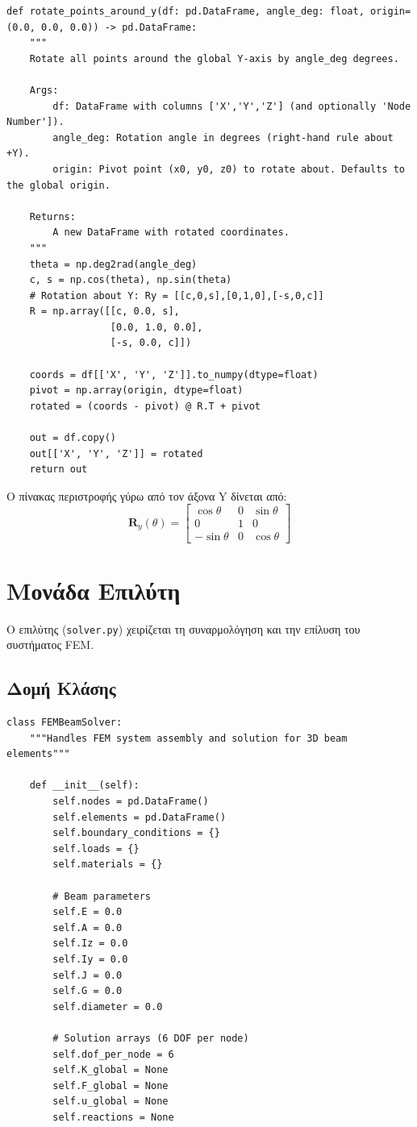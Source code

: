 \documentclass[12pt,a4paper]{article}
\begin{document}
\begin{lstlisting}[caption={Συνάρτηση Περιστροφής Σημείων}]
def rotate_points_around_y(df: pd.DataFrame, angle_deg: float, origin=(0.0, 0.0, 0.0)) -> pd.DataFrame:
    """
    Rotate all points around the global Y-axis by angle_deg degrees.

    Args:
        df: DataFrame with columns ['X','Y','Z'] (and optionally 'Node Number']).
        angle_deg: Rotation angle in degrees (right-hand rule about +Y).
        origin: Pivot point (x0, y0, z0) to rotate about. Defaults to the global origin.

    Returns:
        A new DataFrame with rotated coordinates.
    """
    theta = np.deg2rad(angle_deg)
    c, s = np.cos(theta), np.sin(theta)
    # Rotation about Y: Ry = [[c,0,s],[0,1,0],[-s,0,c]]
    R = np.array([[c, 0.0, s],
                  [0.0, 1.0, 0.0],
                  [-s, 0.0, c]])

    coords = df[['X', 'Y', 'Z']].to_numpy(dtype=float)
    pivot = np.array(origin, dtype=float)
    rotated = (coords - pivot) @ R.T + pivot

    out = df.copy()
    out[['X', 'Y', 'Z']] = rotated
    return out
\end{lstlisting}

Ο πίνακας περιστροφής γύρω από τον άξονα Y δίνεται από:
\begin{equation}
\mathbf{R}_y(\theta) = \begin{bmatrix}
\cos\theta & 0 & \sin\theta \\
0 & 1 & 0 \\
-\sin\theta & 0 & \cos\theta
\end{bmatrix}
\end{equation}

\section{Μονάδα Επιλύτη}

Ο επιλύτης (\texttt{solver.py}) χειρίζεται τη συναρμολόγηση και την επίλυση του συστήματος FEM.

\subsection{Δομή Κλάσης}

\begin{lstlisting}[caption={Αρχικοποίηση Κλάσης FEMBeamSolver}]
class FEMBeamSolver:
    """Handles FEM system assembly and solution for 3D beam elements"""
    
    def __init__(self):
        self.nodes = pd.DataFrame()
        self.elements = pd.DataFrame()
        self.boundary_conditions = {}
        self.loads = {}
        self.materials = {}
        
        # Beam parameters
        self.E = 0.0
        self.A = 0.0
        self.Iz = 0.0
        self.Iy = 0.0
        self.J = 0.0
        self.G = 0.0
        self.diameter = 0.0
        
        # Solution arrays (6 DOF per node)
        self.dof_per_node = 6
        self.K_global = None
        self.F_global = None
        self.u_global = None
        self.reactions = None
\end{lstlisting}
\end{document}
